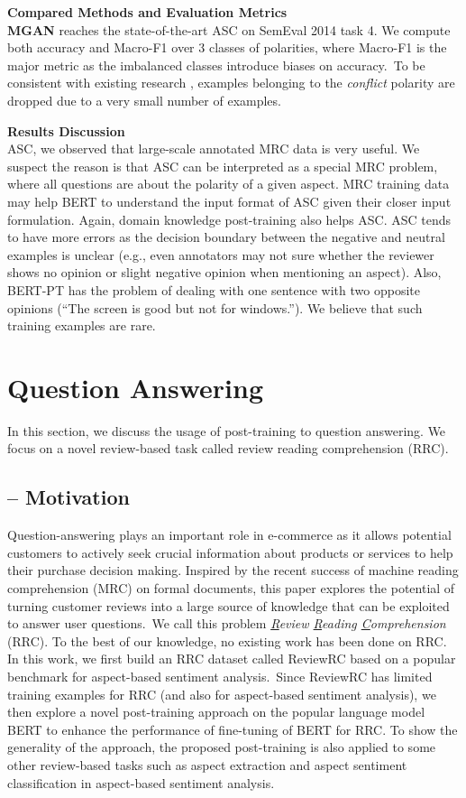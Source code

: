 \textbf{Compared Methods and Evaluation Metrics}\\
\textbf{MGAN} \cite{li2018exploiting} reaches the state-of-the-art ASC on SemEval 2014 task 4.
We compute both accuracy and Macro-F1 over 3 classes of polarities, where Macro-F1 is the major metric as the imbalanced classes introduce biases on accuracy.~To be consistent with existing research \cite{tang2016aspect}, examples belonging to the \textit{conflict} polarity are dropped due to a very small number of examples.


\textbf{Results Discussion}\\
ASC, we observed that large-scale annotated MRC data is very useful.
We suspect the reason is that ASC can be interpreted as a special MRC problem, where all questions are about the polarity of a given aspect.
MRC training data may help BERT to understand the input format of ASC given their closer input formulation.
Again, domain knowledge post-training also helps ASC.
ASC tends to have more errors as the decision boundary between the negative and neutral examples is unclear (e.g., even annotators may not sure whether the reviewer shows no opinion or slight negative opinion when mentioning an aspect).
Also, BERT-PT has the problem of dealing with one sentence with two opposite opinions (``The screen is good but not for windows.''). We believe that such training examples are rare.


\section{Question Answering}
\label{chap6:sec:qa}

In this section, we discuss the usage of post-training to question answering.
We focus on a novel review-based task called review reading comprehension (RRC).

\subsection{-- Motivation}
Question-answering plays an important role in e-commerce as it allows potential customers to actively seek crucial information about products or services to help their purchase decision making. 
Inspired by the recent success of machine reading comprehension (MRC) on formal documents, this paper explores the potential of turning customer reviews into a large source of knowledge that can be exploited to answer user questions.~We call this problem \textit{\underline{R}eview \underline{R}eading \underline{C}omprehension} (RRC). To the best of our knowledge, no existing work has been done on RRC. In this work, we first build an RRC dataset called ReviewRC based on a popular benchmark for aspect-based sentiment analysis.~Since ReviewRC has limited training examples for RRC (and also for aspect-based sentiment analysis), we then explore a novel post-training approach on the popular language model BERT to enhance the performance of fine-tuning of BERT for RRC.
To show the generality of the approach, the proposed post-training is also applied to some other review-based tasks such as aspect extraction and aspect sentiment classification in aspect-based sentiment analysis. 

